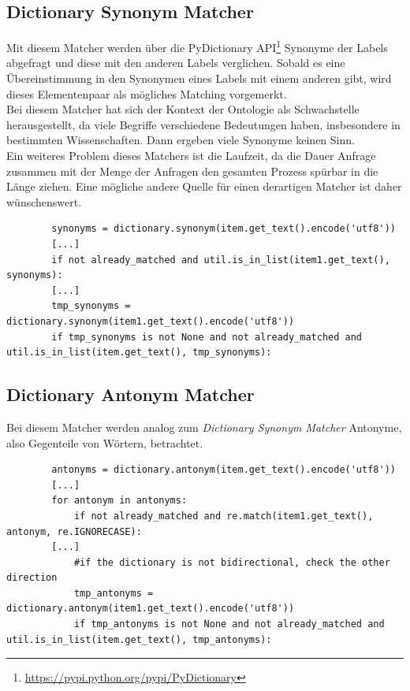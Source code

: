 		\subsection{Dictionary Synonym Matcher}
		Mit diesem Matcher werden über die PyDictionary
		API\footnote{\url{https://pypi.python.org/pypi/PyDictionary}} Synonyme der
		Labels abgefragt und diese mit den anderen Labels verglichen. Sobald es eine Übereinstimmung in den Synonymen eines Labels mit einem anderen gibt, wird
		dieses Elementenpaar als mögliches Matching vorgemerkt.\\
		Bei diesem Matcher hat sich der Kontext der Ontologie als Schwachstelle
		herausgestellt, da viele Begriffe verschiedene Bedeutungen haben, insbesondere
		in bestimmten Wissenschaften. Dann ergeben viele Synonyme keinen Sinn.\\
		Ein weiteres Problem dieses Matchers ist die Laufzeit, da die Dauer Anfrage
		zusammen mit der Menge der Anfragen den gesamten Prozess spürbar in die Länge
		ziehen. Eine mögliche andere Quelle für einen derartigen Matcher ist daher
		wünschenswert.
		\begin{lstlisting}
		synonyms = dictionary.synonym(item.get_text().encode('utf8'))
		[...]
		if not already_matched and util.is_in_list(item1.get_text(), synonyms):
		[...]
		tmp_synonyms = dictionary.synonym(item1.get_text().encode('utf8'))
		if tmp_synonyms is not None and not already_matched and	util.is_in_list(item.get_text(), tmp_synonyms):
		\end{lstlisting}
		
		\subsection{Dictionary Antonym Matcher}
		Bei diesem Matcher werden analog zum \textit{Dictionary Synonym Matcher}
		Antonyme, also Gegenteile von Wörtern, betrachtet.
		\begin{lstlisting}
		antonyms = dictionary.antonym(item.get_text().encode('utf8'))
		[...]
		for antonym in antonyms:
        	if not already_matched and re.match(item1.get_text(), antonym, re.IGNORECASE):
		[...]
		    #if the dictionary is not bidirectional, check the other direction
            tmp_antonyms = dictionary.antonym(item1.get_text().encode('utf8'))
            if tmp_antonyms is not None and not already_matched and util.is_in_list(item.get_text(), tmp_antonyms):
		\end{lstlisting}
		
